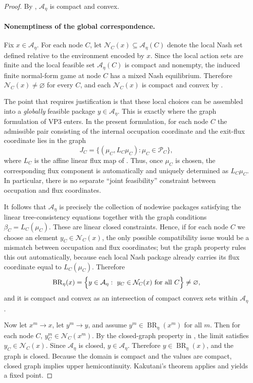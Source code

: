 \documentclass[12pt]{article}
\theoremstyle{definition}
\newcommand{\1}{\mathbf{1}}
\newcommand{\cA}{\mathcal{A}}
\newcommand{\cN}{\mathcal{N}}
\begin{document}
\begin{proof}
By , \(\cA_\eta\) is compact and convex.

\paragraph{Nonemptiness of the global correspondence.}
Fix \(x\in \cA_\eta\). For each node \(C\), let \(\cN_C(x)\subseteq \cA_\eta(C)\) denote the local Nash set defined relative to the environment encoded by \(x\). Since the local action sets are finite and the local feasible set \(\cA_\eta(C)\) is compact and nonempty, the induced finite normal-form game at node \(C\) has a mixed Nash equilibrium. Therefore \(\cN_C(x)\neq\varnothing\) for every \(C\), and each \(\cN_C(x)\) is compact and convex by .

The point that requires justification is that these local choices can be assembled into a \emph{globally} feasible package \(y\in \cA_\eta\). This is exactly where the graph formulation of VP3 enters. In the present formulation, for each node \(C\) the admissible pair consisting of the internal occupation coordinate and the exit-flux coordinate lies in the graph
\[
J_C=\{(\mu_C,L_C\mu_C):\mu_C\in \mathcal P_C\},
\]
where \(L_C\) is the affine linear flux map of . Thus, once \(\mu_C\) is chosen, the corresponding flux component is automatically and uniquely determined as \(L_C\mu_C\). In particular, there is no separate ``joint feasibility'' constraint between occupation and flux coordinates.

It follows that \(\cA_\eta\) is precisely the collection of nodewise packages satisfying the linear tree-consistency equations together with the graph conditions \(\beta_C=L_C(\mu_C)\). These are linear closed constraints. Hence, if for each node \(C\) we choose an element \(y_C\in \cN_C(x)\), the only possible compatibility issue would be a mismatch between occupation and flux coordinates; but the graph property rules this out automatically, because each local Nash package already carries its flux coordinate equal to \(L_C(\mu_C)\). Therefore
\[
\operatorname{BR}_\eta(x)
=
\Bigl\{y\in \cA_\eta:\ y_C\in \cN_C(x)\ \text{for all }C\Bigr\}
\neq\varnothing,
\]
and it is compact and convex as an intersection of compact convex sets within \(\cA_\eta\).

Now let \(x^m\to x\), let \(y^m\to y\), and assume \(y^m\in \operatorname{BR}_\eta(x^m)\)
for all \(m\).  Then for each node \(C\), \(y_C^m\in \cN_C(x^m)\).  By the closed-graph
property in , the limit satisfies \(y_C\in \cN_C(x)\).  Since
\(\cA_\eta\) is closed, \(y\in \cA_\eta\).  Therefore \(y\in \operatorname{BR}_\eta(x)\),
and the graph is closed.  Because the domain is compact and the values are compact,
closed graph implies upper hemicontinuity.  Kakutani's theorem applies and yields a fixed
point.
\end{proof}
\end{document}
